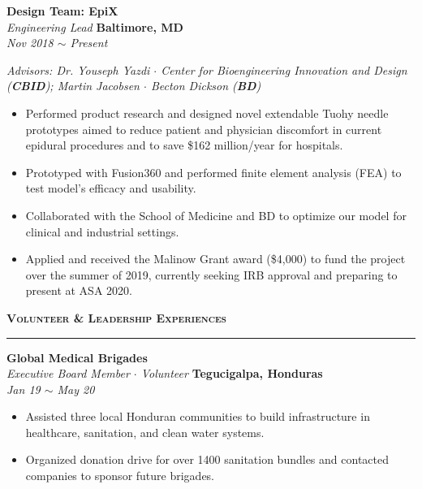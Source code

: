 \documentclass[10pt, letterpaper]{article}
\begin{document}
\begin{paracol}{2}
	\textbf{Design Team: EpiX}\\
	\textit{Engineering Lead}
	\switchcolumn
	\raggedleft\textbf{Baltimore, MD}\\
	\raggedleft\textit{Nov 2018 $\sim$ Present}
\end{paracol}\vspace{-1mm}
\textit{Advisors: Dr. Youseph Yazdi $\cdot$ Center for Bioengineering Innovation and
Design (\textbf{CBID}); Martin Jacobsen $\cdot$ Becton Dickson (\textbf{BD})}
\vspace{-2mm}
\begin{itemize}
	\item Performed product research and designed novel extendable Tuohy needle 
	prototypes aimed to reduce patient and 
	physician discomfort in current epidural procedures and to save \$162 million/year for 
	hospitals.\vspace{-3mm}
	\item Prototyped with Fusion360 and performed finite
	element analysis (FEA) to test model's efficacy and usability.\vspace{-3mm}
	\item Collaborated with the School of Medicine and BD to optimize our
	model for clinical and industrial settings.\vspace{-3mm}
	\item Applied and received the Malinow Grant award (\$4,000) to fund the project over 
	the summer of 2019, currently seeking IRB approval and preparing to present at ASA 2020. 
\end{itemize}

{\large \textbf{\textsc{Volunteer \& Leadership Experiences}}}
\vspace{5pt}
\hrule

\begin{paracol}{2}
	\textbf{Global Medical Brigades}\\
	\textit{Executive Board Member $\cdot$ Volunteer}
	\switchcolumn
	\raggedleft\textbf{Tegucigalpa, Honduras}\\
	\raggedleft\textit{Jan 19 $\sim$ May 20}
\end{paracol}\vspace{-1mm}
\vspace{-2mm}
\begin{itemize}
	\item Assisted three local Honduran communities to build infrastructure in healthcare, sanitation, and clean water systems.\vspace{-3mm}
	\item Organized donation drive for over 1400 sanitation bundles and contacted companies to sponsor future brigades.
\end{itemize}
\vspace{-2mm}
\end{document}
